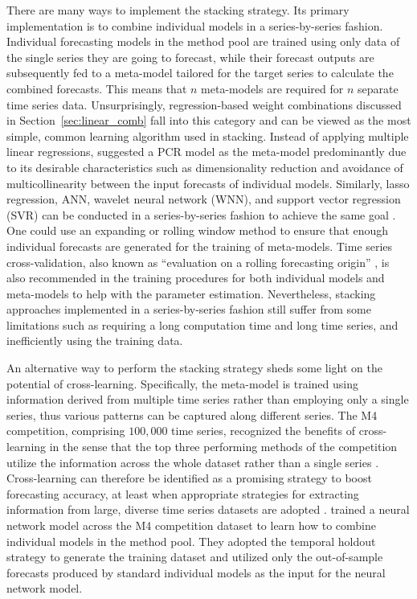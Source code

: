 \documentclass[a4paper,11pt]{article}
\begin{document}
There are many ways to implement the stacking strategy. Its primary implementation is to combine individual models in a series-by-series fashion. Individual forecasting models in the method pool are trained using only data of the single series they are going to forecast, while their forecast outputs are subsequently fed to a meta-model tailored for the target series to calculate the combined forecasts. This means that $n$ meta-models are required for $n$ separate time series data. Unsurprisingly, regression-based weight combinations discussed in Section~\ref{sec:linear_comb} \citep[e.g.,][]{Granger1984-jc,Gunter1992-go} fall into this category and can be viewed as the most simple, common learning algorithm used in stacking. Instead of applying multiple linear regressions, \citet{Moon2020-ls} suggested a PCR model as the meta-model predominantly due to its desirable characteristics such as dimensionality reduction and avoidance of multicollinearity between the input forecasts of individual models. Similarly, lasso regression, ANN, wavelet neural network (WNN), and support vector regression (SVR) can be conducted in a series-by-series fashion to achieve the same goal \citep[e.g.,][]{Donaldson1996-um,Conflitti2015-fq,Ribeiro2019-wk,Ribeiro2020-mj}. One could use an expanding or rolling window method to ensure that enough individual forecasts are generated for the training of meta-models. Time series cross-validation, also known as ``evaluation on a rolling forecasting origin'' \citep{Hyndman2021-tx}, is also recommended in the training procedures for both individual models and meta-models to help with the parameter estimation. Nevertheless, stacking approaches implemented in a series-by-series fashion still suffer from some limitations such as requiring a long computation time and long time series, and inefficiently using the training data.

An alternative way to perform the stacking strategy sheds some light on the potential of cross-learning. Specifically, the meta-model is trained using information derived from multiple time series rather than employing only a single series, thus various patterns can be captured along different series. The M4 competition, comprising $100,000$ time series, recognized the benefits of cross-learning in the sense that the top three performing methods of the competition utilize the information across the whole dataset rather than a single series \citep{Makridakis2020-hu}. Cross-learning can therefore be identified as a promising strategy to boost forecasting accuracy, at least when appropriate strategies for extracting information from large, diverse time series datasets are adopted \citep{Kang2020-sa,Semenoglou2020-xx}. \citet{Zhao2020-ep} trained a neural network model across the M4 competition dataset to learn how to combine individual models in the method pool. They adopted the temporal holdout strategy to generate the training dataset and utilized only the out-of-sample forecasts produced by standard individual models as the input for the neural network model.
\end{document}
